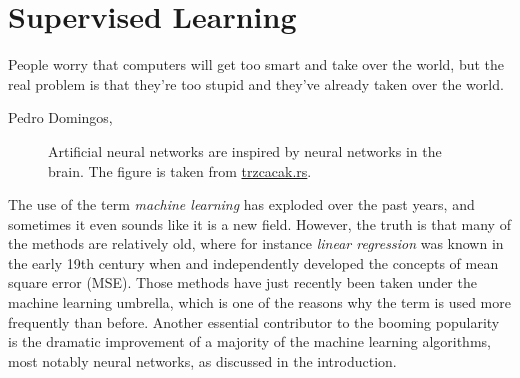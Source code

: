 \chapter{Supervised Learning} \label{chp:machinelearning}
\epigraph{People worry that computers will get too smart and take over the world, but the real problem is that they're too stupid and they've already taken over the world.}{Pedro Domingos, \supercite{domingos_master_2015}}
\begin{figure}[H]
	\centering
	\caption{Artificial neural networks are inspired by neural networks in the brain. The figure is taken from  \href{http://www.trzcacak.rs}{trzcacak.rs}.}
\end{figure}

The use of the term \textit{machine learning} has exploded over the past years, and sometimes it even sounds like it is a new field. However, the truth is that many of the methods are relatively old, where for instance \textit{linear regression} was known in the early 19th century when \citet{legendre_nouvelles_1805} and \citet{gauss_theoria_1809} independently developed the concepts of mean square error (MSE). Those methods have just recently been taken under the machine learning umbrella, which is one of the reasons why the term is used more frequently than before. Another essential contributor to the booming popularity is the dramatic improvement of a majority of the machine learning algorithms, most notably neural networks, as discussed in the introduction.


